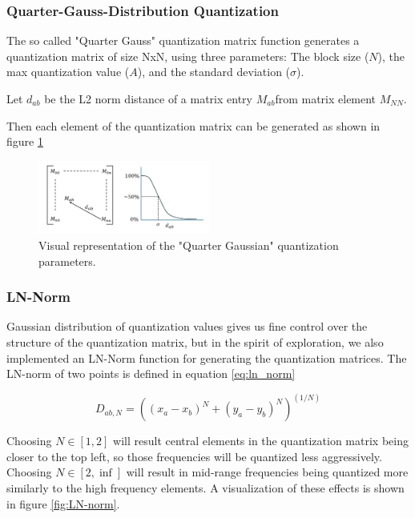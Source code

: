 \subsubsection{Quarter-Gauss-Distribution Quantization}

The so called "Quarter Gauss" quantization matrix function generates a quantization matrix of size NxN, using three parameters: The block size ($N$), the max quantization value ($A$), and the standard deviation ($\sigma$).

Let $d_{ab}$ be the L2 norm distance of a matrix entry $M_{ab}$from matrix element $M_{NN}$.

Then each element of the quantization matrix can be generated as shown in figure \ref{fig:gaussian_quant}

\begin{figure}
	\includegraphics[width=0.5\textwidth]{assets/Quarter Gauss Quantization.png}
	\caption{Visual representation of the "Quarter Gaussian" quantization parameters.}
	\label{fig:gaussian_quant}
\end{figure}

\subsubsection{LN-Norm}

Gaussian distribution of quantization values gives us fine control over the structure of the quantization matrix, but in the spirit of exploration, we also implemented an LN-Norm function for generating the quantization matrices.
The LN-norm of two points is defined in equation \ref{eq:ln_norm}

\begin{equation}
D_{ab, N} = ((x_a - x_b)^N + (y_a - y_b)^N)^{(1/N)}
\label{eq:ln_norm}
\end{equation}

Choosing $N\in[1,2]$ will result central elements in the quantization matrix being closer to the top left, so those frequencies will be quantized less aggressively. Choosing $N\in[2,\inf]$ will result in mid-range frequencies being quantized more similarly to the high frequency elements. 
A visualization of these effects is shown in figure \ref{fig:LN-norm}.

